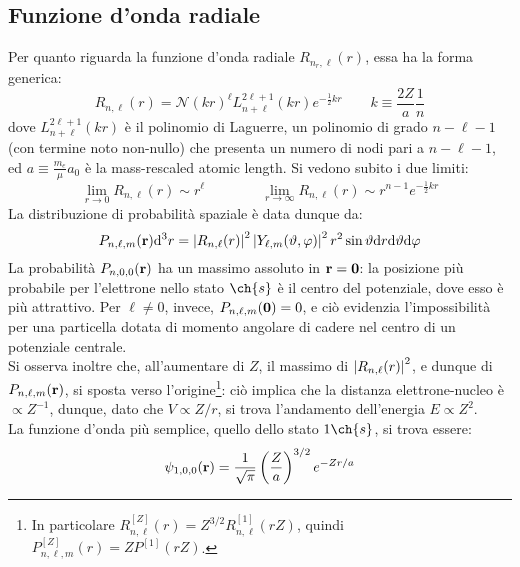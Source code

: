 \subsection{Funzione d'onda radiale}

Per quanto riguarda la funzione d'onda radiale $ R_{n_r,\ell}(r) $, essa ha la forma generica:
\begin{equation}
	R_{n,\ell}(r) = \mathcal{N} (kr)^\ell L_{n+\ell}^{2\ell + 1}(kr) e^{-\frac{1}{2} kr}
	\qquad
	k \equiv \frac{2Z}{a} \frac{1}{n}
	\label{eq:1-e-radial}
\end{equation}
dove $ L_{n+\ell}^{2\ell+1}(kr) $ è il polinomio di Laguerre, un polinomio di grado $ n - \ell - 1 $ (con termine noto non-nullo) che presenta un numero di nodi pari a $ n - \ell - 1 $, ed $ a \equiv \frac{m_e}{\mu} a_0 $ è la mass-rescaled atomic length. Si vedono subito i due limiti:
\begin{equation*}
	\lim_{r \rightarrow 0} R_{n,\ell}(r) \sim r^\ell
	\qquad \qquad
	\lim_{r \rightarrow \infty} R_{n,\ell}(r) \sim r^{n-1} e^{-\frac{1}{2} kr}
\end{equation*}
La distribuzione di probabilità spaziale è data dunque da:
\begin{equation}
	P_{n,\ell,m}(\mathbf{r}) \mathrm{d}^3r = \left\lvert R_{n,\ell}(r)\right\rvert^2 \left\lvert Y_{\ell,m}(\vartheta,\varphi)\right\rvert^2 r^2 \sin{\vartheta} \mathrm{d} r \mathrm{d} \vartheta \mathrm{d} \varphi
\end{equation}
La probabilità $ P_{n,0,0}(\mathbf{r}) $ ha un massimo assoluto in $ \mathbf{r} = \mathbf{0} $: la posizione più probabile per l'elettrone nello stato $ \ch{s} $ è il centro del potenziale, dove esso è più attrattivo. Per $ \ell \neq 0 $, invece, $ P_{n,\ell,m}(\mathbf{0}) = 0 $, e ciò evidenzia l'impossibilità per una particella dotata di momento angolare di cadere nel centro di un potenziale centrale.\\
Si osserva inoltre che, all'aumentare di $ Z $, il massimo di $ \left\lvert R_{n,\ell}(r)\right\rvert^2 $, e dunque di $ P_{n,\ell,m}(\mathbf{r}) $, si sposta verso l'origine\footnote{In particolare $ R_{n,\ell}^{[Z]}(r) = Z^{3/2} R_{n,\ell}^{[1]}(rZ) $, quindi $ P_{n,\ell,m}^{[Z]}(r) = Z P^{[1]}(rZ) $.}: ciò implica che la distanza elettrone-nucleo è $ \propto Z^{-1} $, dunque, dato che $ V \propto Z/r $, si trova l'andamento dell'energia $ E \propto Z^2 $.\\
La funzione d'onda più semplice, quello dello stato $ 1\ch{s} $, si trova essere:
\begin{equation}
	\psi_{1,0,0}(\mathbf{r}) = \frac{1}{\sqrt{\pi}} \left( \frac{Z}{a} \right)^{3/2} e^{- Z r / a}
\end{equation}

